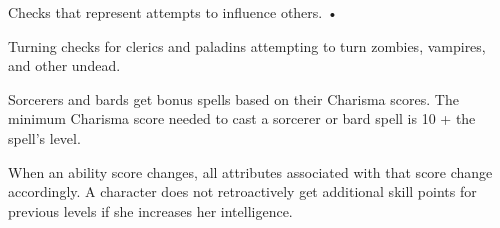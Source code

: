 \documentclass{article}
\begin{document}
Checks that represent attempts to influence others. • 

\parindent=7pt
Turning checks for clerics and paladins attempting to turn zombies, vampires, and 
other undead.

\parindent=0pt
Sorcerers and bards get bonus spells based on their Charisma scores. The minimum 
Charisma score needed to cast a sorcerer or bard spell is 10 + the spell's level.

\vspace{12pt}
When an ability score changes, all attributes associated with that score change 
accordingly. A character does not retroactively get additional skill points for 
previous levels if she increases her intelligence.

\newpage
\end{document}
